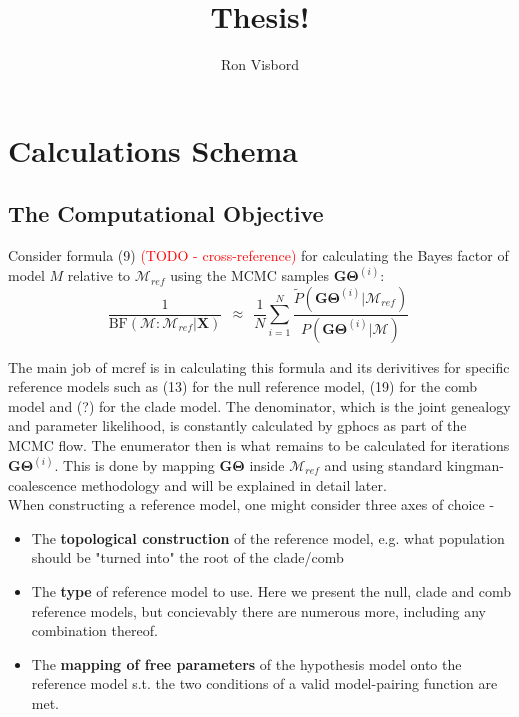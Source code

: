\documentclass[11pt]{article}
\author{Ron Visbord}
\title{Thesis!}
\newcommand{\vect}[1]{\boldsymbol{\mathbf{#1}}}
\newcommand{\X}{\vect{X}}
\newcommand{\M}{\mathcal{M}}
\newcommand{\G}{\vect{G}}
\newcommand{\T}{\vect{\Theta}}
\newcommand{\GT}{\G\T}
\newcommand{\Mref}{\M_{ref}}
\newcommand{\Pref}{\widetilde{P}}
\newcommand{\rbf}{\text{BF}}
\newcommand{\1}{\mathbbm{1}}
\begin{document}
\maketitle


\section{Calculations Schema}


\subsection{The Computational Objective}

Consider formula (9) \textcolor{red}{(TODO - cross-reference)} for calculating the Bayes factor of model $M$ relative to $\Mref$ using the MCMC samples $\GT^{(i)}$:
%
%
\begin{equation}\label{eq:rbf}
 \frac{1}{\rbf(\M:\Mref|\X)}  ~~\approx~~ \frac{1}{N} \sum_{i=1}^{N}\frac{\Pref(\GT^{(i)}|\Mref) }{P(\GT^{(i)}|\M)} ~ 
\end{equation}

The main job of mcref is in calculating this formula and its derivitives for specific reference models such as (13) for the null reference model, (19) for the comb model and (?) for the clade model.
The denominator, which is the joint genealogy and parameter likelihood, is constantly calculated by gphocs as part of the MCMC flow. The enumerator then is what remains to be calculated for iterations $\GT^{(i)}$. This is done by mapping $\GT$ inside $\Mref$ and using standard kingman-coalescence methodology and will be explained in detail later.\\

When constructing a reference model, one might consider three axes of choice - 
\begin{itemize}
\item The \textbf{topological construction} of the reference model, e.g. what population should be "turned into" the root of the clade/comb

\item The \textbf{type} of reference model to use. Here we present the null, clade and comb reference models, but concievably there are numerous more, including any combination thereof.

\item The \textbf{mapping of free parameters} of the hypothesis model onto the reference model s.t. the two conditions of a valid model-pairing function are met.
\end{itemize}
\end{document}

